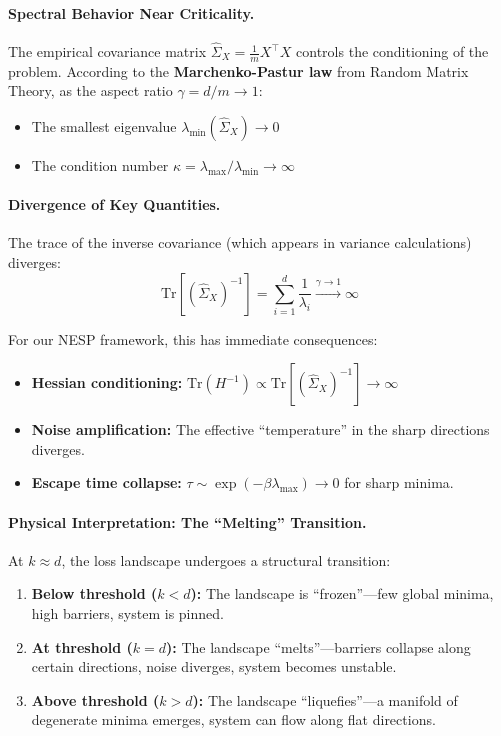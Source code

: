 \documentclass[
  journal=largetwo,
  year=2025,
  volume=37,
]{cup-journal}
\begin{document}
\paragraph{Spectral Behavior Near Criticality.}
The empirical covariance matrix $\hat{\Sigma}_X = \frac{1}{m} X^\top X$ controls the conditioning of the problem. According to the \textbf{Marchenko-Pastur law} from Random Matrix Theory, as the aspect ratio $\gamma = d/m \to 1$:
\begin{itemize}
    \item The smallest eigenvalue $\lambda_{\min}(\hat{\Sigma}_X) \to 0$
    \item The condition number $\kappa = \lambda_{\max}/\lambda_{\min} \to \infty$
\end{itemize}

\paragraph{Divergence of Key Quantities.}
The trace of the inverse covariance (which appears in variance calculations) diverges:
\begin{equation}\label{eq:trace_divergence}
    \text{Tr}\left[ (\hat{\Sigma}_X)^{-1} \right] = \sum_{i=1}^{d} \frac{1}{\lambda_i} \xrightarrow{\gamma \to 1} \infty
\end{equation}

For our NESP framework, this has immediate consequences:
\begin{itemize}
    \item \textbf{Hessian conditioning:} $\text{Tr}(H^{-1}) \propto \text{Tr}[(\hat{\Sigma}_X)^{-1}] \to \infty$
    \item \textbf{Noise amplification:} The effective ``temperature'' in the sharp directions diverges.
    \item \textbf{Escape time collapse:} $\tau \sim \exp(-\beta \lambda_{\max}) \to 0$ for sharp minima.
\end{itemize}



\paragraph{Physical Interpretation: The ``Melting'' Transition.}
At $k \approx d$, the loss landscape undergoes a structural transition:
\begin{enumerate}
    \item \textbf{Below threshold ($k < d$):} The landscape is ``frozen''---few global minima, high barriers, system is pinned.
    \item \textbf{At threshold ($k = d$):} The landscape ``melts''---barriers collapse along certain directions, noise diverges, system becomes unstable.
    \item \textbf{Above threshold ($k > d$):} The landscape ``liquefies''---a manifold of degenerate minima emerges, system can flow along flat directions.
\end{enumerate}
\end{document}
